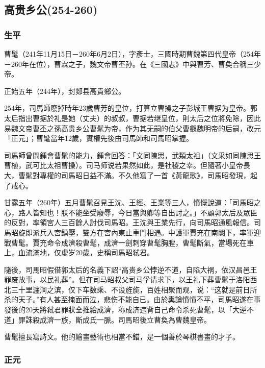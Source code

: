 
\subsection{高贵乡公\tiny(254-260)}

\subsubsection{生平}

曹髦（241年11月15日－260年6月2日），字彥士，三國時期曹魏第四代皇帝（254年－260年在位），曹霖之子，魏文帝曹丕孙。在《三國志》中與曹芳、曹奐合稱三少帝。

正始五年（244年），封郯县高貴鄉公。

254年，司馬師廢掉時年23歲曹芳的皇位，打算立曹操之子彭城王曹据为皇帝。郭太后指出曹据於礼是她（丈夫）的叔叔，曹据若继皇位，則太后之位將免除，因此易魏文帝曹丕之孫高贵乡公曹髦为帝，作为其无嗣的伯父曹叡魏明帝的后嗣，改元「正元」；曹髦當年12歲，實權先後由司馬師和司馬昭掌握。

司馬師曾問鍾會曹髦的能力，鍾會回答：「文同陳思，武類太祖」（文采如同陳思王曹植，武可比太祖曹操）。司马师说若果然如此，是社稷之幸。但隨著小皇帝長大，曹髦對專權的司馬昭日益不滿。不久他寫了一首《黃龍歌》，司馬昭發現，起了戒心。

甘露五年（260年）五月曹髦召見王沈、王經、王業等三人，憤慨說道：「司馬昭之心，路人皆知也！朕不能坐受廢辱，今日當與卿等自出討之。」不顧郭太后及眾臣的反對，率領宮人三百餘人討伐司馬昭。王沈與王業先行，向司馬昭通風報信。司馬昭旋即派兵入宮鎮壓，雙方在宮內東止車門相遇。中護軍賈充在南闕下，率軍迎戰曹髦。賈充命令成濟殺曹髦，成濟一劍刺穿曹髦胸膛，曹髦斷氣，當場死在車上，血流滿地，仅虚岁20歲，史稱司馬昭弒君。

隨後，司馬昭假借郭太后的名義下詔“高贵乡公悖逆不道，自陷大祸，依汉昌邑王罪废故事，以民礼葬”。但在司马昭叔父司马孚请求下，以王礼下葬曹髦于洛阳西北三十里瀍涧之滨，仅下车数乘、不设旌旐，百姓相聚而观，说：“这就是前日所杀的天子。”有人甚至掩面而泣，悲伤不能自已。由於輿論憤憤不平，司馬昭遂在事發後的20天將弒君罪狀全推給成濟，称成济违背自己命令杀死曹髦，以「大逆不道」罪誅殺成濟一族，斷成氏一脈。司馬昭後立曹奐為曹魏皇帝。

曹髦擅長寫詩文。他的繪畫藝術也相當不錯，是一個善於琴棋書畫的才子。


\subsubsection{正元}

